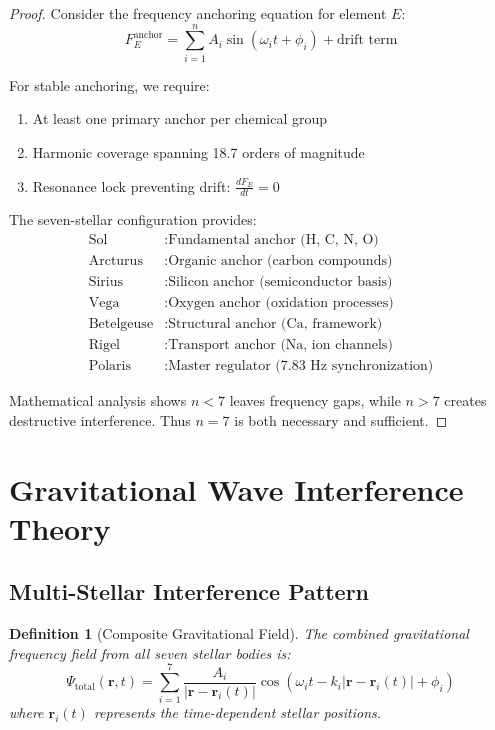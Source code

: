\documentclass[12pt]{article}
\newtheorem{definition}{Definition}
\newcommand{\stellar}[1]{\text{#1}}
\begin{document}
\begin{proof}
Consider the frequency anchoring equation for element $E$:
\begin{equation}
F_E^{\text{anchor}} = \sum_{i=1}^{n} A_i \sin(\omega_i t + \phi_i) + \text{drift term}
\end{equation}

For stable anchoring, we require:
\begin{enumerate}
\item At least one primary anchor per chemical group
\item Harmonic coverage spanning 18.7 orders of magnitude  
\item Resonance lock preventing drift: $\frac{dF_E}{dt} = 0$
\end{enumerate}

The seven-stellar configuration provides:
\begin{align}
\stellar{Sol} &: \text{Fundamental anchor (H, C, N, O)} \\
\stellar{Arcturus} &: \text{Organic anchor (carbon compounds)} \\
\stellar{Sirius} &: \text{Silicon anchor (semiconductor basis)} \\
\stellar{Vega} &: \text{Oxygen anchor (oxidation processes)} \\
\stellar{Betelgeuse} &: \text{Structural anchor (Ca, framework)} \\
\stellar{Rigel} &: \text{Transport anchor (Na, ion channels)} \\
\stellar{Polaris} &: \text{Master regulator (7.83 Hz synchronization)}
\end{align}

Mathematical analysis shows $n < 7$ leaves frequency gaps, while $n > 7$ creates destructive interference. Thus $n = 7$ is both necessary and sufficient.
\end{proof}

\section{Gravitational Wave Interference Theory}

\subsection{Multi-Stellar Interference Pattern}

\begin{definition}[Composite Gravitational Field]
The combined gravitational frequency field from all seven stellar bodies is:
\begin{equation}
\Psi_{\text{total}}(\mathbf{r}, t) = \sum_{i=1}^{7} \frac{A_i}{\left|\mathbf{r} - \mathbf{r}_i(t)\right|} \cos\left(\omega_i t - k_i \left|\mathbf{r} - \mathbf{r}_i(t)\right| + \phi_i\right)
\end{equation}
where $\mathbf{r}_i(t)$ represents the time-dependent stellar positions.
\end{definition}
\end{document}
